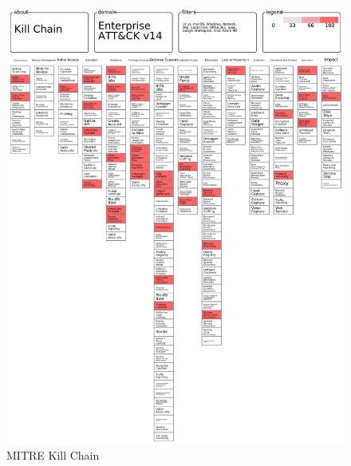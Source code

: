\begin{figure}[H]
\centering
\includegraphics[width=1\linewidth]{images/output.png}
\caption{MITRE Kill Chain}
\label{fig:enter-label}
\end{figure}

\clearpage
